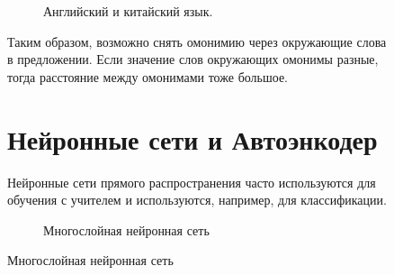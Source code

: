 \documentclass[12pt]{article}
\begin{document}
\begin{figure}[h]
 	\begin{figure}[H]
		\noindent{}
		\caption{Английский и китайский язык.}
		\label{figCurves}
	\end{figure}

	

Таким образом, возможно снять омонимию через окружающие слова в предложении. Если значение слов окружающих омонимы разные, тогда расстояние между омонимами тоже большое.

\section{Нейронные сети и Автоэнкодер}

Нейронные сети прямого распространения часто используются для обучения с учителем и используются, например, для классификации.

  \begin{figure}[H]
    \noindent{}
    \caption{Многослойная нейронная сеть}
    \label{figCurves}
  \end{figure}


\end{figure}
\end{document}

